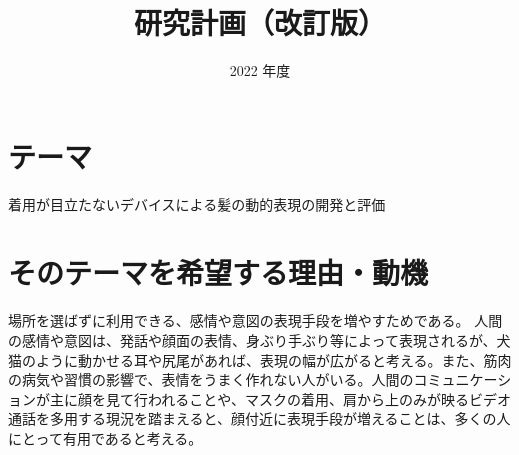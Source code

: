 \documentclass[a4paper]{jsarticle}
\begin{document}
\masterthesis %


\title{研究計画（改訂版）}
\date{2022 年度}
\maketitle


\setcounter{page}{1} %



\newpage

\setcounter{page}{1} %


\section{テーマ}
着用が目立たないデバイスによる髪の動的表現の開発と評価

\section{そのテーマを希望する理由・動機}
場所を選ばずに利用できる、感情や意図の表現手段を増やすためである。
人間の感情や意図は、発話や顔面の表情、身ぶり手ぶり等によって表現されるが、犬猫のように動かせる耳や尻尾があれば、表現の幅が広がると考える。また、筋肉の病気や習慣の影響で、表情をうまく作れない人がいる。人間のコミュニケーションが主に顔を見て行われることや、マスクの着用、肩から上のみが映るビデオ通話を多用する現況を踏まえると、顔付近に表現手段が増えることは、多くの人にとって有用であると考える。
\end{document}

